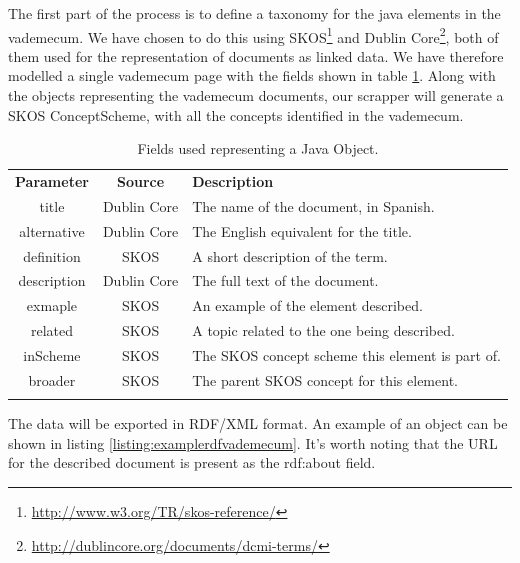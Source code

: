 The first part of the process is to define a taxonomy for the java elements in the vademecum. We have chosen to do this using SKOS\footnote{\url{http://www.w3.org/TR/skos-reference/}} and Dublin Core\footnote{\url{http://dublincore.org/documents/dcmi-terms/}}, both of them used for the representation of documents as linked data. We have therefore modelled a single vademecum page with the fields shown in table \ref{tab:taxonomyfields}. Along with the objects representing the vademecum documents, our scrapper will generate a SKOS ConceptScheme, with all the concepts identified in the vademecum. 

\begin{center}
  \begin{table}
    \begin{tabular*}{0.7\textwidth}{@{\extracolsep{\fill}} | c | c | p{} |}
      \hhline{|-|-|-|}
      \textbf{Parameter} & \textbf{Source} & \textbf{Description} \\ \hhline{|=|=|=|}
      title & Dublin Core &  The name of the document, in Spanish. \\ \hhline{|-|-|-|}
      alternative & Dublin Core & The English equivalent for the title. \\ \hhline{|-|-|-|}
      definition & SKOS & A short description of the term.  \\ \hhline{|-|-|-|}
      description & Dublin Core & The full text of the document.  \\ \hhline{|-|-|-|}
      exmaple & SKOS & An example of the element described.  \\ \hhline{|-|-|-|}
      related & SKOS & A topic related to the one being described. \\ \hhline{|-|-|-|}
      inScheme & SKOS & The SKOS concept scheme this element is part of.  \\ \hhline{|-|-|-|}
      broader & SKOS & The parent SKOS concept for this element. \\ \hhline{|-|-|-|}
      \end{tabular*}
    \caption{Fields used representing a Java Object.}
    \label{tab:taxonomyfields}
  \end{table}
\end{center}

The data will be exported in RDF/XML format. An example of an object can be shown in listing \ref{listing:examplerdfvademecum}. It's worth noting that the URL for the described document is present as the rdf:about field.

